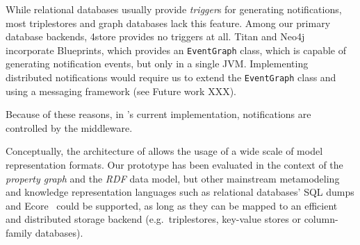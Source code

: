 While relational databases usually provide \emph{trigger}s for generating notifications, most triplestores and graph databases lack this feature. Among our primary database backends, 4store provides no triggers at all. Titan and Neo4j incorporate Blueprints, which provides an \texttt{EventGraph} class, which is capable of generating notification events, but only in a single JVM. Implementing distributed notifications would require us to extend the \texttt{EventGraph} class and using a messaging framework (see Future work XXX). 

Because of these reasons, in \iqd{}'s current implementation, notifications are controlled by the middleware.




Conceptually, the architecture of \iqd{} allows the usage of a wide scale of model representation formats. Our prototype has been evaluated in the context of %
the \emph{property graph} and the \emph{RDF} data model, but other mainstream metamodeling and knowledge representation languages such as relational databases' SQL dumps and Ecore~\cite{EMF} could be supported, as long as they can be mapped to an efficient and distributed storage backend (e.g.\ triplestores, key-value stores or column-family databases).

